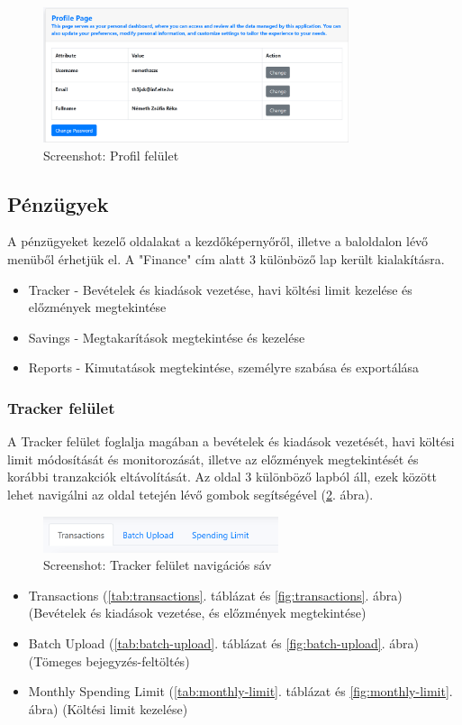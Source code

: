 \begin{figure}[H]
	\centering
	\includegraphics[height=150px]{img/profile}
	\caption{Screenshot: Profil felület}
	\label{fig:profile}
\end{figure}

\subsection{Pénzügyek}
A pénzügyeket kezelő oldalakat a kezdőképernyőről, illetve a baloldalon lévő menüből érhetjük el. A "Finance" cím alatt 3 különböző lap került kialakításra.
\begin{itemize}
	\item Tracker - Bevételek és kiadások vezetése, havi költési limit kezelése és előzmények megtekintése
	\item Savings - Megtakarítások megtekintése és kezelése
	\item Reports - Kimutatások megtekintése, személyre szabása és exportálása
\end{itemize}

\subsubsection{Tracker felület}
A Tracker felület foglalja magában a bevételek és kiadások vezetését, havi költési limit módosítását és monitorozását, illetve az előzmények megtekintését és korábbi tranzakciók eltávolítását. Az oldal 3 különböző lapból áll, ezek között lehet navigálni az oldal tetején lévő gombok segítségével (\ref{fig:tracker-tabs}. ábra).
\begin{figure}[H]
	\centering
	\includegraphics[height=40px]{img/tracker-tabs}
	\caption{Screenshot: Tracker felület navigációs sáv}
	\label{fig:tracker-tabs}
\end{figure}
\begin{itemize}
	\item Transactions (\ref{tab:transactions}. táblázat és \ref{fig:transactions}. ábra) (Bevételek és kiadások vezetése, és előzmények megtekintése)
	\item Batch Upload (\ref{tab:batch-upload}. táblázat és \ref{fig:batch-upload}. ábra) (Tömeges bejegyzés-feltöltés)
	\item Monthly Spending Limit (\ref{tab:monthly-limit}. táblázat és \ref{fig:monthly-limit}. ábra) (Költési limit kezelése) 
\end{itemize}

